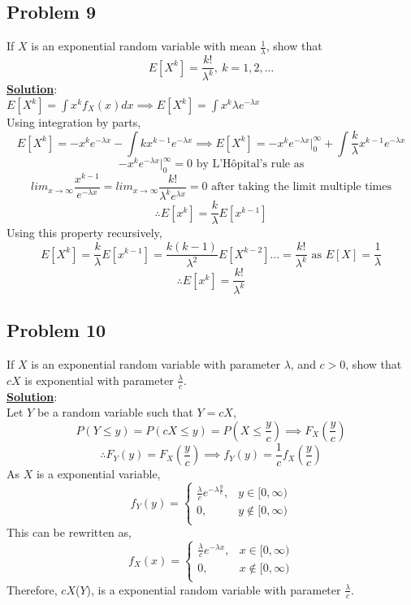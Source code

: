 \documentclass[11pt,letter paper]{report}
\begin{document}
\subsection*{Problem 9}
If $X$ is an exponential random variable with mean $\frac{1}{\lambda}$, show that
$$E[X^k]=\frac{k!}{\lambda^k},\: k=1,2,\dots$$
{\bf \underline{Solution}}:\\
$E[X^k]=\int x^kf_X(x)dx\implies E[X^k]=\int x^k\lambda e^{-\lambda x}$\\
Using integration by parts, 
$$E[X^k]=-x^ke^{-\lambda x}-\int kx^{k-1}e^{-\lambda x}\implies E[X^k]=-x^ke^{-\lambda x}\bigg|_0^{\infty}+\int \frac{k}{\lambda}x^{k-1}e^{-\lambda x}$$
$$-x^ke^{-\lambda x}\bigg|_0^{\infty}=0 \text{ by L'Hôpital's rule as}$$
$$lim_{x\to \infty}\frac{x^{k-1}}{e^{-\lambda x}}=lim_{x\to \infty}\frac{k!}{\lambda^k e^{\lambda x}}=0\text{ after taking the limit multiple times}$$
$$\therefore E[x^k]=\frac{k}{\lambda}E[x^{k-1}]$$
Using this property recursively, 
$$E[X^k]=\frac{k}{\lambda}E[x^{k-1}]=\frac{k(k-1)}{\lambda^2}E[X^{k-2}]\dots=\frac{k!}{\lambda^k}\text{ as } E[X]=\frac{1}{\lambda}$$
$$\therefore E[x^k]=\frac{k!}{\lambda^k}$$

\subsection*{Problem 10}
If $X$ is an exponential random variable with parameter $\lambda$, and $c>0$, show that $cX$ is exponential with parameter $\frac{\lambda}{c}$. \\[0.1cm]
{\bf \underline{Solution}}:\\
Let $Y$ be a random variable such that $Y=cX$, 
$$P(Y\le y)=P(cX\le y)=P(X\le \frac{y}{c})\implies F_X(\frac{y}{c})$$
$$\therefore F_Y(y)=F_X(\frac{y}{c})\implies f_Y(y)=\frac{1}{c}f_X(\frac{y}{c})$$
As $X$ is a exponential variable, 
$$f_Y(y)=\begin{cases}
\frac{\lambda}{c} e^{-\lambda \frac{y}{c}}, & y\in [0,\infty)\\
0, & y\not\in [0,\infty)\\
\end{cases}$$
This can be rewritten as, 
$$f_X(x)=\begin{cases}
\frac{\lambda}{c} e^{-\lambda x}, & x\in [0,\infty)\\
0, & x\not\in [0,\infty)\\
\end{cases}$$
Therefore, $cX$($Y$), is a exponential random variable with parameter $\frac{\lambda}{c}$.
\end{document}
